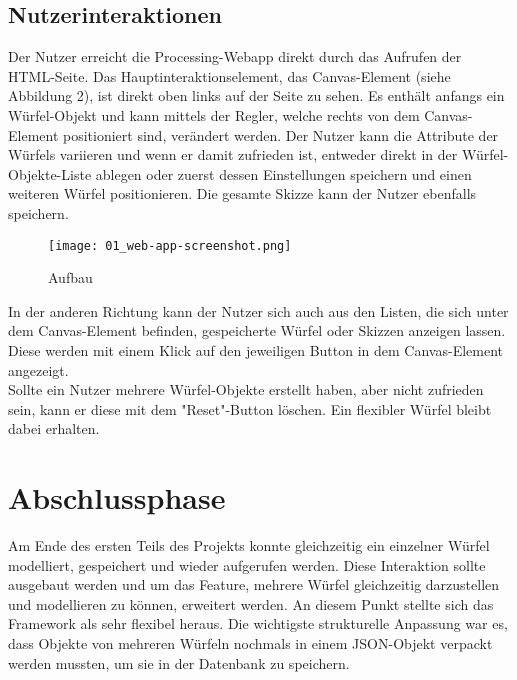 \documentclass[12pt, ngerman, utf8]{article}
\begin{document}
\subsection{Nutzerinteraktionen}
Der Nutzer erreicht die Processing-Webapp direkt durch das Aufrufen der HTML-Seite. Das Hauptinteraktionselement, das Canvas-Element (siehe Abbildung 2), ist direkt oben links auf der Seite zu sehen. Es enthält anfangs ein Würfel-Objekt und kann mittels der Regler, welche rechts von dem Canvas-Element positioniert sind, verändert werden. Der Nutzer kann die Attribute der Würfels variieren und wenn er damit zufrieden ist, entweder direkt in der Würfel-Objekte-Liste ablegen oder zuerst dessen Einstellungen speichern und einen weiteren Würfel positionieren. Die gesamte Skizze kann der Nutzer ebenfalls speichern.\\

\begin{figure}[H]
    \centering
    \texttt{[image: 01\_web-app-screenshot.png]}
    \caption{Aufbau}
\end{figure}

In der anderen Richtung kann der Nutzer sich auch aus den Listen, die sich unter dem Canvas-Element befinden, gespeicherte Würfel oder Skizzen anzeigen lassen. Diese werden mit einem Klick auf den jeweiligen Button in dem Canvas-Element angezeigt.\\
Sollte ein Nutzer mehrere Würfel-Objekte erstellt haben, aber nicht zufrieden sein, kann er diese mit dem "Reset"-Button löschen. Ein flexibler Würfel bleibt dabei erhalten.

\section{Abschlussphase}
Am Ende des ersten Teils des Projekts konnte gleichzeitig ein einzelner Würfel modelliert, gespeichert und wieder aufgerufen werden. Diese Interaktion sollte ausgebaut werden und um das Feature, mehrere Würfel gleichzeitig darzustellen und modellieren zu können, erweitert werden. An diesem Punkt stellte sich das Framework als sehr flexibel heraus. 
Die wichtigste strukturelle Anpassung war es, dass Objekte von mehreren Würfeln nochmals in einem JSON-Objekt verpackt werden mussten, um sie in der Datenbank zu speichern.
\end{document}
